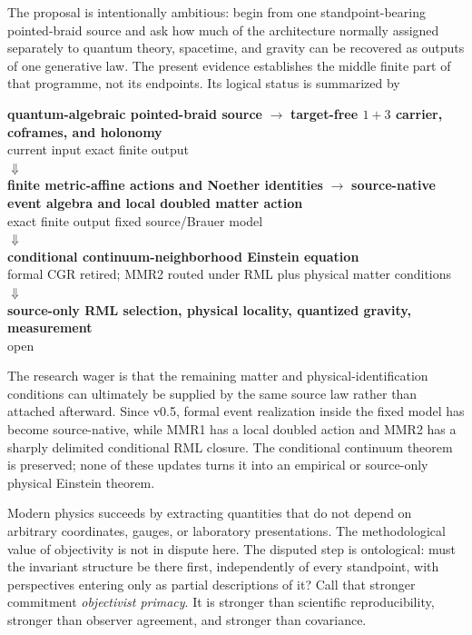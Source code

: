 \documentclass[11pt]{article}
\theoremstyle{definition}
\theoremstyle{remark}
\begin{document}
The proposal is intentionally ambitious: begin from one standpoint-bearing pointed-braid source and ask how much of the architecture normally assigned separately to quantum theory, spacetime, and gravity can be recovered as outputs of one generative law. The present evidence establishes the middle finite part of that programme, not its endpoints. Its logical status is summarized by
\begin{center}
\begin{minipage}{0.96\linewidth}
\centering
\small
\textbf{quantum-algebraic pointed-braid source}
$\longrightarrow$
\textbf{target-free $1+3$ carrier, coframes, and holonomy}\\[-0.15em]
{\footnotesize current input \hspace{16em} exact finite output}\\[0.25em]
$\Downarrow$\\[-0.1em]
\textbf{finite metric-affine actions and Noether identities}
$\longrightarrow$
\textbf{source-native event algebra and local doubled matter action}\\[-0.15em]
{\footnotesize exact finite output \hspace{6em} fixed source/Brauer model}\\[0.25em]
$\Downarrow$\\[-0.1em]
\textbf{conditional continuum-neighborhood Einstein equation}\\[-0.15em]
{\footnotesize formal CGR retired; MMR2 routed under RML plus physical matter conditions}\\[0.25em]
$\Downarrow$\\[-0.1em]
\textbf{source-only RML selection, physical locality, quantized gravity, measurement}\\[-0.15em]
{\footnotesize open}
\end{minipage}
\end{center}
The research wager is that the remaining matter and physical-identification conditions can ultimately be supplied by the same source law rather than attached afterward. Since v0.5, formal event realization inside the fixed model has become source-native, while MMR1 has a local doubled action and MMR2 has a sharply delimited conditional RML closure. The conditional continuum theorem is preserved; none of these updates turns it into an empirical or source-only physical Einstein theorem.

Modern physics succeeds by extracting quantities that do not depend on arbitrary coordinates, gauges, or laboratory presentations. The methodological value of objectivity is not in dispute here. The disputed step is ontological: must the invariant structure be there first, independently of every standpoint, with perspectives entering only as partial descriptions of it? Call that stronger commitment \emph{objectivist primacy}. It is stronger than scientific reproducibility, stronger than observer agreement, and stronger than covariance.
\end{document}
